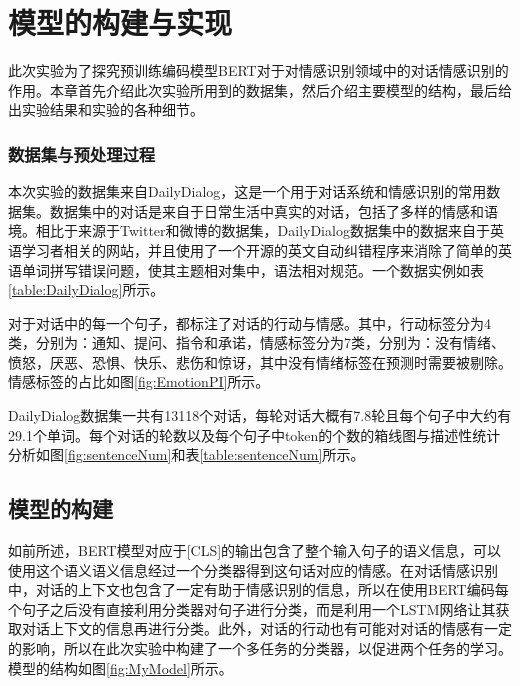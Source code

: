 \section{模型的构建与实现}\label{sec:3}

此次实验为了探究预训练编码模型BERT对于对情感识别领域中的对话情感识别的作用。本章首先介绍此次实验所用到的数据集，然后介绍主要模型的结构，最后给出实验结果和实验的各种细节。

\subsubsection{数据集与预处理过程}

本次实验的数据集来自DailyDialog\cite{dailydialog}，这是一个用于对话系统和情感识别的常用数据集。数据集中的对话是来自于日常生活中真实的对话，包括了多样的情感和语境。相比于来源于Twitter和微博的数据集，DailyDialog数据集中的数据来自于英语学习者相关的网站，并且使用了一个开源的英文自动纠错程序来消除了简单的英语单词拼写错误问题，使其主题相对集中，语法相对规范。一个数据实例如表\ref{table:DailyDialog}所示。



对于对话中的每一个句子，都标注了对话的行动与情感。其中，行动标签分为4类，分别为：通知、提问、指令和承诺，情感标签分为7类，分别为：没有情绪、愤怒，厌恶、恐惧、快乐、悲伤和惊讶，其中没有情绪标签在预测时需要被剔除。情感标签的占比如图\ref{fig:EmotionPI}所示。



DailyDialog数据集一共有13118个对话，每轮对话大概有7.8轮且每个句子中大约有29.1个单词。每个对话的轮数以及每个句子中token的个数的箱线图与描述性统计分析如图\ref{fig:sentenceNum}和表\ref{table:sentenceNum}所示。





\subsection{模型的构建}

如前所述，BERT模型对应于[CLS]的输出包含了整个输入句子的语义信息，可以使用这个语义语义信息经过一个分类器得到这句话对应的情感。在对话情感识别中，对话的上下文也包含了一定有助于情感识别的信息，所以在使用BERT编码每个句子之后没有直接利用分类器对句子进行分类，而是利用一个LSTM网络让其获取对话上下文的信息再进行分类。此外，对话的行动也有可能对对话的情感有一定的影响，所以在此次实验中构建了一个多任务的分类器，以促进两个任务的学习。模型的结构如图\ref{fig:MyModel}所示。

